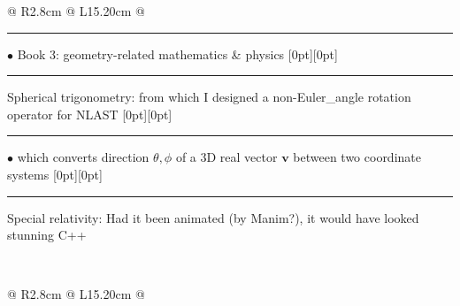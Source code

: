 {{\begin{tabularx}{\linewidth}{@{} R{2.8cm} @{\phantom{d}} L{15.20cm} @{}}
\hspace{-0.30em}\rule[0.25em]{1.0em}{0.5pt}\!\! $\bullet$ {\small Book 3: geometry-related mathematics \& physics} \newline \vspace{-3pt} \hspace{11.8pt} \raisebox{0.18\height}[0pt][0pt]{\vrule width0.5pt height14.5pt} \hspace{-0.30em}\rule[0.25em]{1.1em}{0.5pt}\!\! \raisebox{0.2\height}{\scriptsize $\blacktriangleright$} {\small Spherical trigonometry: from which I designed a non-Euler\_angle rotation operator for NLAST} \newline \vspace{-3pt} \hspace{24.5pt} \raisebox{0.18\height}[0pt][0pt]{\vrule width0.5pt height14.5pt} \hspace{-0.30em}\rule[0.25em]{1.0em}{0.5pt}\!\! $\bullet$ {\small which converts direction $\theta,\phi$ of a 3D real vector $\boldsymbol{v}$ between two coordinate systems} \newline \vspace{-3pt} \hspace{11.8pt} \raisebox{0.09\height}[0pt][0pt]{\vrule width0.5pt height30.0pt} \hspace{-0.30em}\rule[0.25em]{1.1em}{0.5pt}\!\! \raisebox{0.2\height}{\scriptsize $\blacktriangleright$} {\small Special relativity: Had it been animated (by Manim?), it would have looked stunning} \hfill {\small \color{color-detail} C++} \href{https://github.com/ChenZhu-Xie/3_books_with_cpp}{\color{black!50}\faGithub} \\ \Gap\Gap\Gap
\end{tabularx}
\\
\begin{tabularx}{\linewidth}{@{} R{2.8cm} @{\phantom{d}} L{15.20cm} @{}}

\end{tabularx}}}
